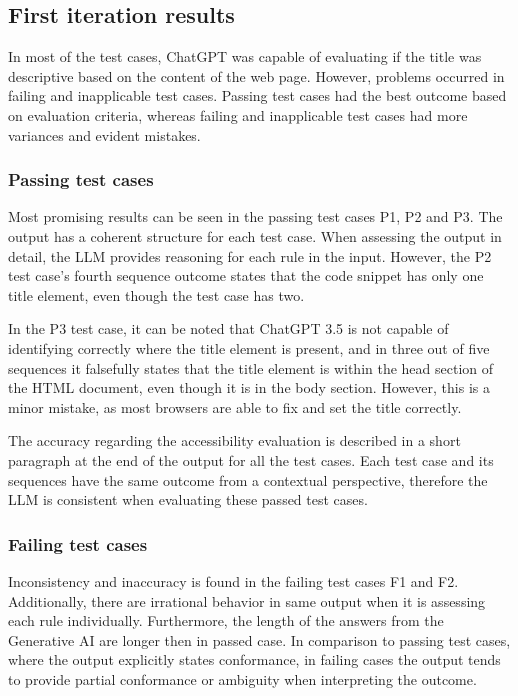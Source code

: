 \subsection{First iteration results}

In most of the test cases, ChatGPT was capable of evaluating if the title was descriptive based on the content of the web page. However, problems occurred in failing and inapplicable test cases. Passing test cases had the best outcome based on evaluation criteria, whereas failing and inapplicable test cases had more variances and evident mistakes.

\subsubsection{Passing test cases}

Most promising results can be seen in the passing test cases P1, P2 and P3. The output has a coherent structure for each test case. When assessing the output in detail, the LLM provides reasoning for each rule in the input. However, the P2 test case's fourth sequence outcome states that the code snippet has only one title element, even though the test case has two.

In the P3 test case, it can be noted that ChatGPT 3.5 is not capable of identifying correctly where the title element is present, and in three out of five sequences it falsefully states that the title element is within the head section of the HTML document, even though it is in the body section. However, this is a minor mistake, as most browsers are able to fix and set the title correctly.

The accuracy regarding the accessibility evaluation is described in a short paragraph at the end of the output for all the test cases. Each test case and its sequences have the same outcome from a contextual perspective, therefore the LLM is consistent when evaluating these passed test cases.

\subsubsection{Failing test cases}

Inconsistency and inaccuracy is found in the failing test cases F1 and F2. Additionally, there are irrational behavior in same output when it is assessing each rule individually. Furthermore, the length of the answers from the Generative AI are longer then in passed case. In comparison to passing test cases, where the output explicitly states conformance, in failing cases the output tends to provide partial conformance or ambiguity when interpreting the outcome. 


